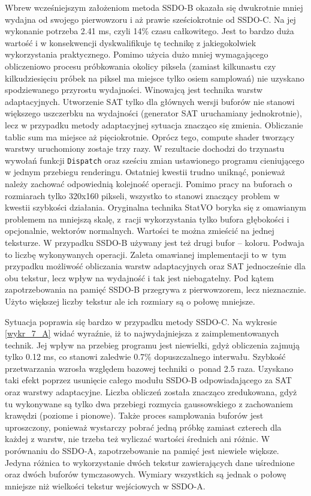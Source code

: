 		Wbrew wcześniejszym założeniom metoda SSDO-B okazała się dwukrotnie mniej wydajna od swojego pierwowzoru i aż prawie sześciokrotnie od SSDO-C. Na jej wykonanie potrzeba 2.41 ms, czyli 14\% czasu całkowitego. Jest to bardzo duża wartość i w konsekwencji dyskwalifikuje tę technikę z jakiegokolwiek wykorzystania praktycznego. Pomimo użycia dużo mniej wymagającego obliczeniowo procesu próbkowania okolicy piksela (zamiast kilkunastu czy kilkudziesięciu próbek na piksel ma miejsce tylko osiem samplowań) nie uzyskano spodziewanego przyrostu wydajności. Winowajcą jest technika warstw adaptacyjnych. Utworzenie SAT tylko dla głównych wersji buforów nie stanowi większego uszczerbku na wydajności (generator SAT uruchamiany jednokrotnie), lecz w przypadku metody adaptacyjnej sytuacja znacząco się zmienia. Obliczanie tablic sum ma miejsce aż pięciokrotnie. Oprócz tego, compute shader tworzący warstwy uruchomiony zostaje trzy razy. W rezultacie dochodzi do trzynastu wywołań funkcji \texttt{Dispatch} oraz sześciu zmian ustawionego programu cieniującego w jednym przebiegu renderingu. Ostatniej kwestii trudno uniknąć, ponieważ należy zachować odpowiednią kolejność operacji. Pomimo pracy na buforach o rozmiarach tylko 320x160 pikseli, wszystko to stanowi znaczący problem w kwestii szybkości działania. Oryginalna technika StatVO \cite{statvo} boryka się z omawianym problemem na mniejszą skalę, z~racji wykorzystania tylko bufora głębokości i opcjonalnie, wektorów normalnych. Wartości te można zmieścić na jednej teksturze. W przypadku SSDO-B używany jest też drugi bufor -- koloru. Podwaja to liczbę wykonywanych operacji. Zaleta omawianej implementacji to w~tym przypadku możliwość obliczania warstw adaptacyjnych oraz SAT jednocześnie dla obu tekstur, lecz wpływ na wydajność i tak jest niebagatelny. Pod kątem zapotrzebowania na pamięć SSDO-B przegrywa z pierwowzorem, lecz nieznacznie. Użyto większej liczby tekstur ale ich rozmiary są o połowę mniejsze.
		
		Sytuacja poprawia się bardzo w przypadku metody SSDO-C. Na wykresie \ref{wykr_7_A} widać wyraźnie, iż to najwydajniejsza z zaimplementowanych technik. Jej wpływ na przebieg programu jest niewielki, gdyż obliczenia zajmują tylko 0.12 ms, co stanowi zaledwie 0.7\% dopuszczalnego interwału. Szybkość przetwarzania wzrosła względem bazowej techniki o~ponad 2.5 raza. Uzyskano taki efekt poprzez usunięcie całego modułu SSDO-B odpowiadającego za SAT oraz warstwy adaptacyjne. Liczba obliczeń została znacząco zredukowana, gdyż tu wykonywane są tylko dwa przebiegi rozmycia gaussowskiego z zachowaniem krawędzi (poziome i pionowe). Także proces samplowania buforów jest uproszczony, ponieważ wystarczy pobrać jedną próbkę zamiast czterech dla każdej z warstw, nie trzeba też wyliczać wartości średnich ani różnic.
		W porównaniu do SSDO-A, zapotrzebowanie na pamięć jest niewiele większe. Jedyna różnica to wykorzystanie dwóch tekstur zawierających dane uśrednione oraz dwóch buforów tymczasowych. Wymiary wszystkich są jednak o połowę mniejsze niż wielkości tekstur wejściowych w SSDO-A.
		
